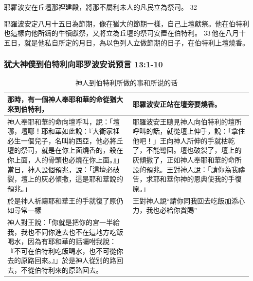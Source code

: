 耶羅波安在丘壇那裡建殿，將那不屬利未人的凡民立為祭司。 32 

耶羅波安定八月十五日為節期，像在猶大的節期一樣，自己上壇獻祭。他在伯特利也這樣向他所鑄的牛犢獻祭，又將立為丘壇的祭司安置在伯特利。 33 他在八月十五日，就是他私自所定的月日，為以色列人立做節期的日子，在伯特利上壇燒香。












































\subsubsection{犹大神僕到伯特利向耶罗波安说预言 13:1-10}
\begin{table}[H]
\hspace{-5mm}
\centering 
\begin{tabular}{p{8.5cm}|p{9.5cm}}\hline\hline
那時，有一個神人奉耶和華的命從猶大來到伯特利，&耶羅波安正站在壇旁要燒香。\\\hline
神人奉耶和華的命向壇呼叫，說：「壇哪，壇哪！耶和華如此說：『大衛家裡必生一個兒子，名叫約西亞，他必將丘壇的祭司，就是在你上面燒香的，殺在你上面，人的骨頭也必燒在你上面。』」當日，神人設個預兆，說：「這壇必破裂，壇上的灰必傾撒，這是耶和華說的預兆。」&耶羅波安王聽見神人向伯特利的壇所呼叫的話，就從壇上伸手，說：「拿住他吧！」王向神人所伸的手就枯乾了，不能彎回。壇也破裂了，壇上的灰傾撒了，正如神人奉耶和華的命所設的預兆。王對神人說：「請你為我禱告，求耶和華你神的恩典使我的手復原。」\\\hline
於是神人祈禱耶和華王的手就復了原仍如尋常一樣&王對神人說“請你同我回去吃飯加添心力，我也必給你賞賜”\\\hline
神人對王說：「你就是把你的宮一半給我，我也不同你進去也不在這地方吃飯喝水，因為有耶和華的話囑咐我說：『不可在伯特利吃飯喝水，也不可從你去的原路回來。』」於是神人從別的路回去，不從伯特利來的原路回去。&\\\hline
\end{tabular}
\caption{神人到伯特利所做的事和所说的话}
\end{table}



